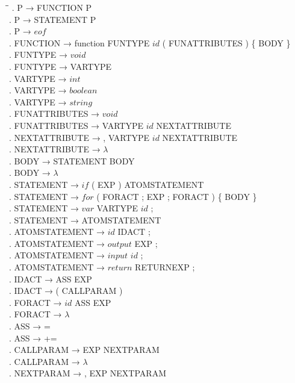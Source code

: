 \begin{tabbing}
    \hspace{1cm}\=\hspace{10cm}\=\kill
    . P → FUNCTION P\\
    . P → STATEMENT P\\
    . P → $eof$\\
    . FUNCTION → function FUNTYPE $id$ ( FUNATTRIBUTES ) \{ BODY \}\\
    . FUNTYPE → $void$\\
    . FUNTYPE → VARTYPE\\
    . VARTYPE → $int$\\
    . VARTYPE → $boolean$\\
    . VARTYPE → $string$\\
    . FUNATTRIBUTES → $void$\\
    . FUNATTRIBUTES → VARTYPE $id$ NEXTATTRIBUTE\\
    . NEXTATTRIBUTE → , VARTYPE $id$ NEXTATTRIBUTE\\
    . NEXTATTRIBUTE → \( \lambda \)\\
    . BODY → STATEMENT BODY\\
    . BODY → \( \lambda \)\\
    . STATEMENT → $if$ ( EXP ) ATOMSTATEMENT\\
    . STATEMENT → $for$ ( FORACT ; EXP ; FORACT ) \{ BODY \}\\
    . STATEMENT → $var$ VARTYPE $id$ ;\\
    . STATEMENT → ATOMSTATEMENT\\
    . ATOMSTATEMENT → $id$ IDACT ;\\
    . ATOMSTATEMENT → $output$ EXP ;\\
    . ATOMSTATEMENT → $input$ $id$ ;\\
    . ATOMSTATEMENT → $return$ RETURNEXP ;\\
    . IDACT → ASS EXP\\
    . IDACT → ( CALLPARAM )\\
    . FORACT → $id$ ASS EXP\\
    . FORACT → \( \lambda \)\\
    . ASS → =\\
    . ASS → +=\\
    . CALLPARAM → EXP NEXTPARAM\\
    . CALLPARAM → \( \lambda \)\\
    . NEXTPARAM → , EXP NEXTPARAM\\

\end{tabbing}
